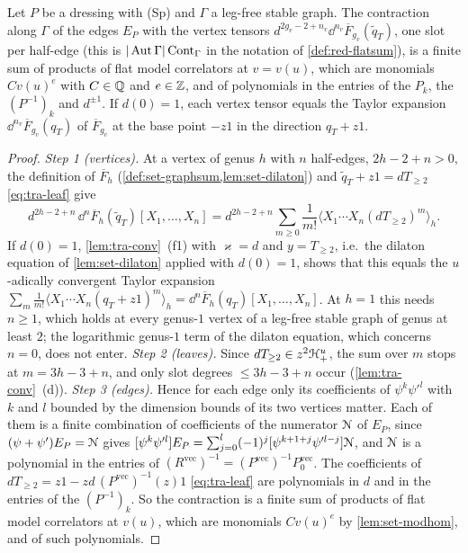 \begin{lem}
\label{lem:tra-F}
Let $P$ be a dressing with (Sp) and $\Gamma$ a leg-free stable graph. The contraction along $\Gamma$ of the edges $E_P$ with the vertex tensors $d^{2g_v-2+n_v}\dd^{n_v}\overline F_{g_v}(\tilde q_T)$, one slot per half-edge (this is $|\operatorname{Aut}\Gamma|\,\mathrm{Cont}_\Gamma$ in the notation of \cref{def:red-flatsum}), is a finite sum of products of flat model correlators at $v = v(u)$, which are monomials $Cv(u)^e$ with $C\in\mathbb{Q}$ and $e\in\mathbb{Z}$, and of polynomials in the entries of the $P_k$, the $(P^{-1})_k$ and $d^{\pm 1}$. If $d(0) = 1$, each vertex tensor equals the Taylor expansion $\dd^{n_v}\overline F_{g_v}(q_T)$ of $\overline F_{g_v}$ at the base point $-z1$ in the direction $q_T+z1$.
\end{lem}

\begin{proof}
\emph{Step 1 (vertices).} At a vertex of genus $h$ with $n$ half-edges, $2h-2+n>0$, the definition of $\overline F_h$ (\cref{def:set-graphsum,lem:set-dilaton}) and $\tilde q_T+z1 = dT_{\geq 2}$ \eqref{eq:tra-leaf} give
\[
d^{2h-2+n}\,\dd^n\overline F_h(\tilde q_T)[X_1,\dots,X_n] = d^{2h-2+n}\sum_{m\geq 0}\frac1{m!}\langle X_1\cdots X_n(dT_{\geq 2})^m\rangle_h .
\]
If $d(0) = 1$, \cref{lem:tra-conv}~(f1) with $\varkappa = d$ and $y = T_{\geq 2}$, i.e.\ the dilaton equation of \cref{lem:set-dilaton} applied with $d(0) = 1$, shows that this equals the $u$-adically convergent Taylor expansion $\sum_m\frac1{m!}\langle X_1\cdots X_n(q_T+z1)^m\rangle_h = \dd^n\overline F_h(q_T)[X_1,\dots,X_n]$. At $h = 1$ this needs $n\geq 1$, which holds at every genus-$1$ vertex of a leg-free stable graph of genus at least $2$; the logarithmic genus-$1$ term of the dilaton equation, which concerns $n = 0$, does not enter. \emph{Step 2 (leaves).} Since $dT_{\geq 2}\in z^2\mathcal{H}^u_+$, the sum over $m$ stops at $m = 3h-3+n$, and only slot degrees $\leq 3h-3+n$ occur (\cref{lem:tra-conv}~(d)). \emph{Step 3 (edges).} Hence for each edge only its coefficients of $\psi^k\psi'^l$ with $k$ and $l$ bounded by the dimension bounds of its two vertices matter. Each of them is a finite combination of coefficients of the numerator $\mathcal{N}$ of $E_P$, since $(\psi+\psi')E_P = \mathcal{N}$ gives $[\psi^k\psi'^l]E_P = \sum_{j=0}^l(-1)^j[\psi^{k+1+j}\psi'^{l-j}]\mathcal{N}$, and $\mathcal{N}$ is a polynomial in the entries of $(R^{\mathrm{vec}})^{-1} = (P^{\mathrm{vec}})^{-1}P_0^{\mathrm{vec}}$. The coefficients of $dT_{\geq 2} = z1-zd\,(P^{\mathrm{vec}})^{-1}(z)1$ \eqref{eq:tra-leaf} are polynomials in $d$ and in the entries of the $(P^{-1})_k$. So the contraction is a finite sum of products of flat model correlators at $v(u)$, which are monomials $Cv(u)^e$ by \cref{lem:set-modhom}, and of such polynomials.
\end{proof}

